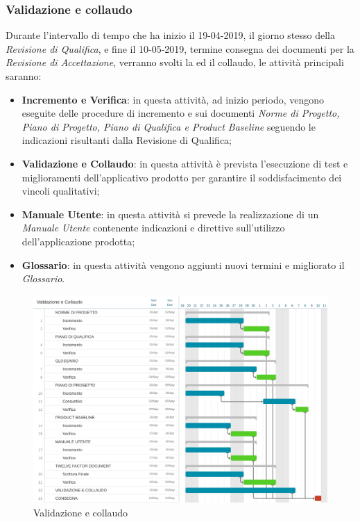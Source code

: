 \clearpage
\subsubsection{Validazione e collaudo}
Durante l'intervallo di tempo che ha inizio il 19-04-2019, il giorno stesso della \emph{Revisione di Qualifica}, e fine il 10-05-2019, termine consegna dei documenti per la \emph{Revisione di Accettazione}, verranno svolti la  ed il collaudo, le attività principali saranno:
\begin{itemize}
	\item \textbf{Incremento e Verifica}: in questa attività, ad inizio periodo, vengono eseguite delle procedure di incremento e  sui documenti \emph{Norme di Progetto, Piano di Progetto, Piano di Qualifica e Product Baseline} seguendo le indicazioni risultanti dalla Revisione di Qualifica;
	\item \textbf{Validazione e Collaudo}: in questa attività è prevista l'esecuzione di test e miglioramenti dell'applicativo prodotto per garantire il soddisfacimento dei vincoli qualitativi;
	\item \textbf{Manuale Utente}: in questa attività si prevede la realizzazione di un \emph{Manuale Utente} contenente indicazioni e direttive sull'utilizzo dell'applicazione prodotta;
	\item \textbf{Glossario}: in questa attività vengono aggiunti nuovi termini e migliorato il \emph{Glossario}.
\end{itemize}
\begin{figure}[htbp]
	\centering
	\includegraphics[width=15cm,keepaspectratio]{../includes/pics/grafici/Gantt_validazione_collaudo.jpeg}
	\caption{\label{fig:mission} Validazione e collaudo}
\end{figure}

